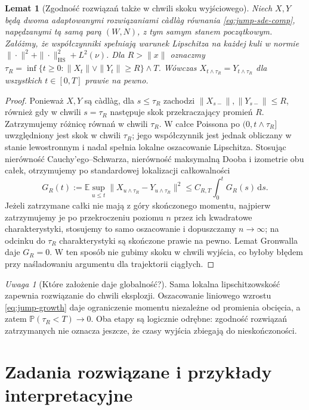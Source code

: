 \documentclass[11pt,a4paper,oneside]{report}
\numberwithin{equation}{chapter}
\theoremstyle{plain}
\newtheorem{lemat}[twierdzenie]{Lemat}
\theoremstyle{definition}
\theoremstyle{remark}
\newtheorem{uwaga}{Uwaga}[chapter]
\newcommand{\Prob}{\mathbb{P}}
\newcommand{\E}{\mathbb{E}}
\newcommand{\dd}{\mathrm{d}}
\begin{document}
\begin{lemat}[Zgodność rozwiązań także w chwili skoku wyjściowego]
\label{lem:jump-exit-audit}
Niech $X,Y$ będą dwoma adaptowanymi rozwiązaniami càdlàg
równania \eqref{eq:jump-sde-comp}, napędzanymi tą samą parą
$(W,N)$, z tym samym stanem początkowym. Załóżmy, że
współczynniki spełniają warunek Lipschitza na każdej kuli
w normie $\|\cdot\|^2+\|\cdot\|_{\mathrm{HS}}^2+L^2(\nu)$.
Dla $R>\|x\|$ oznaczmy
$\tau_R=\inf\{t\ge0:\|X_t\|\vee\|Y_t\|\ge R\}\wedge T$.
Wówczas $X_{t\wedge\tau_R}=Y_{t\wedge\tau_R}$ dla
wszystkich $t\in[0,T]$ prawie na pewno.
\end{lemat}
\begin{proof}
Ponieważ $X,Y$ są càdlàg, dla $s\le\tau_R$ zachodzi
$\|X_{s-}\|,\|Y_{s-}\|\le R$, również gdy w chwili
$s=\tau_R$ następuje skok przekraczający promień $R$.
Zatrzymujemy różnicę równań w chwili $\tau_R$. W całce
Poissona po $(0,t\wedge\tau_R]$ uwzględniony jest skok
w chwili $\tau_R$; jego współczynnik jest jednak obliczany
w stanie lewostronnym i nadal spełnia lokalne oszacowanie
Lipschitza. Stosując nierówność Cauchy'ego--Schwarza,
nierówność maksymalną Dooba i izometrie obu całek,
otrzymujemy po standardowej lokalizacji całkowalności
\[
 G_R(t):=\E\sup_{u\le t}
 \|X_{u\wedge\tau_R}-Y_{u\wedge\tau_R}\|^2
 \le C_{R,T}\int_0^t G_R(s)\,\dd s.
\]
Jeżeli zatrzymane całki nie mają z góry skończonego
momentu, najpierw zatrzymujemy je po przekroczeniu poziomu
$n$ przez ich kwadratowe charakterystyki, stosujemy to samo
oszacowanie i dopuszczamy $n\to\infty$; na odcinku do
$\tau_R$ charakterystyki są skończone prawie na pewno.
Lemat Gronwalla daje $G_R=0$. W ten sposób nie gubimy
skoku w chwili wyjścia, co byłoby błędem przy
naśladowaniu argumentu dla trajektorii ciągłych.
\end{proof}

\begin{uwaga}[Które założenie daje globalność?]
Sama lokalna lipschitzowskość zapewnia rozwiązanie do chwili
eksplozji. Oszacowanie liniowego wzrostu
\eqref{eq:jump-growth} daje ograniczenie momentu niezależne
od promienia obcięcia, a zatem $\Prob(\tau_R<T)\to0$.
Oba etapy są logicznie odrębne: zgodność rozwiązań
zatrzymanych nie oznacza jeszcze, że czasy wyjścia
zbiegają do nieskończoności.
\end{uwaga}

\section{Zadania rozwiązane i przykłady interpretacyjne}
\end{document}
